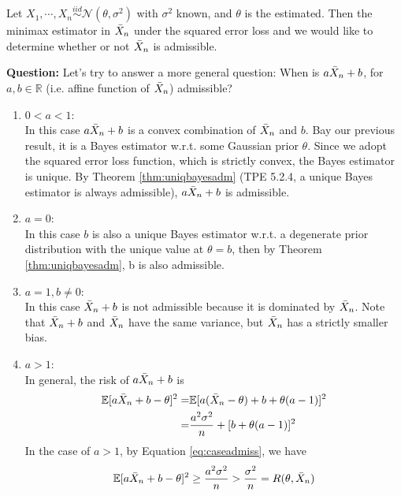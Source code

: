\begin{example}
    Let $X_1,\cdots,X_n\overset{iid}{\sim}\mathcal{N}(\theta,\sigma^2)$ with $\sigma^2$ known, 
    and $\theta$ is the estimated.
    Then the minimax estimator in $\Bar{X}_n$ under the squared error loss and we would like to 
    determine whether or not $\Bar{X}_n$ is admissible.

    \textbf{Question:} Let's try to answer a more general question: When is $a\Bar{X}_n+b$,
    for $a,b\in\mathbb{R}$ (i.e. affine function of $\Bar{X}_n$) admissible?
    \begin{enumerate}[{Case} 1]
        \item $0<a<1$:\\
        In this case $a\Bar{X}_n+b$ is a convex combination of $\Bar{X}_n$ and $b$.
        Bay our previous result,
        it is a Bayes estimator w.r.t. some Gaussian prior $\theta$.
        Since we adopt the squared error loss function,
        which is strictly convex,
        the Bayes estimator is unique.
        By Theorem \ref{thm:uniqbayesadm} (TPE 5.2.4, a unique Bayes estimator is always admissible),
        $a\Bar{X}_n+b$ is admissible.
        
        \item $a=0$:\\
        In this case $b$ is also a unique Bayes estimator w.r.t. 
        a degenerate prior distribution with the unique value at $\theta=b$,
        then by Theorem \ref{thm:uniqbayesadm}, b is also admissible.
        
        \item $a=1,b\neq{0}$:\\
        In this case $\Bar{X}_n+b$ is not admissible
        because it is dominated by $\Bar{X}_n$.
        Note that $\Bar{X}_n+b$ and $\Bar{X}_n$ have the same variance,
        but $\Bar{X}_n$ has a strictly smaller bias.
        
        \item $a>1$:\\
        In general, the risk of $a\Bar{X}_n+b$ is
        \begin{align}
            \mathbb{E}[a\Bar{X}_n+b-\theta]^2
            =& \mathbb{E}[a(\Bar{X}_n-\theta)+b+\theta(a-1)]^2\\
            =& \frac{a^2\sigma^2}{n} + [b+\theta(a-1)]^2\label{eq:caseadmiss}
        \end{align}
        In the case of $a>1$, by Equation \ref{eq:caseadmiss}, we have 
        \begin{gather}
            \mathbb{E}[a\Bar{X}_n+b-\theta]^2\geq\frac{a^2\sigma^2}{n}>\frac{\sigma^2}{n}=R(\theta,\Bar{X}_n)
        \end{gather}


\end{enumerate}
\end{example}
